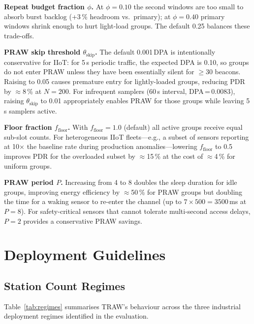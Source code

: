 \documentclass[journal]{IEEEtran}
\begin{document}
\textbf{Repeat budget fraction $\phi$.}
At $\phi\!=\!0.10$ the second windows are too small to absorb
burst backlog (+3\,\% headroom vs.\ primary); at $\phi\!=\!0.40$
primary windows shrink enough to hurt light-load groups.
The default 0.25 balances these trade-offs.

\textbf{PRAW skip threshold $\theta_\mathrm{skip}$.}
The default 0.001\,DPA is intentionally conservative for IIoT:
for 5\,s periodic traffic, the expected DPA is 0.10, so groups
do not enter PRAW unless they have been essentially silent for
$\geq$30 beacons.
Raising to 0.05 causes premature entry for lightly-loaded groups,
reducing PDR by $\approx$8\,\% at $N\!=\!200$.
For infrequent samplers (60\,s interval, DPA\,=\,0.0083),
raising $\theta_\mathrm{skip}$ to 0.01 appropriately enables PRAW
for those groups while leaving 5\,s samplers active.

\textbf{Floor fraction $f_\mathrm{floor}$.}
With $f_\mathrm{floor}\!=\!1.0$ (default) all active groups receive
equal sub-slot counts.
For heterogeneous IIoT fleets---e.g., a subset of sensors reporting
at 10× the baseline rate during production anomalies---lowering
$f_\mathrm{floor}$ to 0.5 improves PDR for the overloaded subset by
$\approx$15\,\% at the cost of $\approx$4\,\% for uniform groups.

\textbf{PRAW period $P$.}
Increasing from 4 to 8 doubles the sleep duration for idle groups,
improving energy efficiency by $\approx$50\,\% for PRAW groups but
doubling the time for a waking sensor to re-enter the channel
(up to $7\!\times\!500\!=\!3500$\,ms at $P\!=\!8$).
For safety-critical sensors that cannot tolerate multi-second access
delays, $P\!=\!2$ provides a conservative PRAW savings.

\section{Deployment Guidelines}
\label{sec:discuss}

\subsection{Station Count Regimes}

Table~\ref{tab:regimes} summarises TRAW's behaviour across the three
industrial deployment regimes identified in the evaluation.
\end{document}
